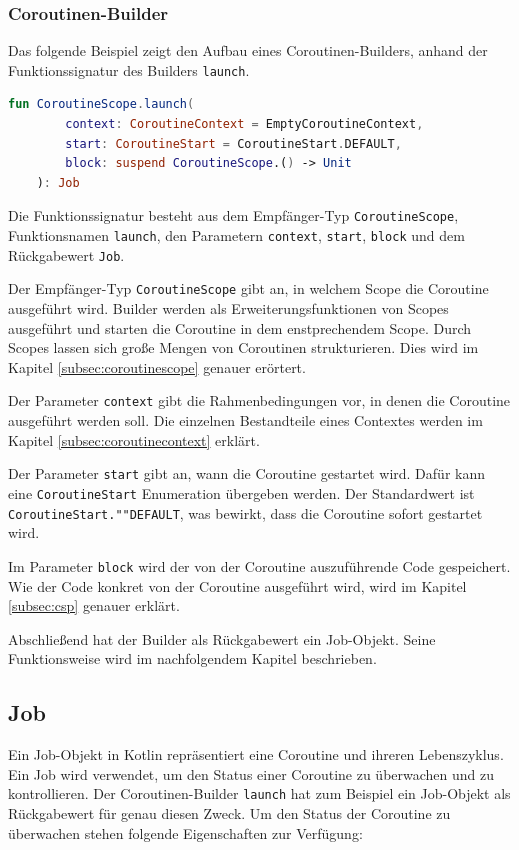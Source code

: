 \documentclass[fontsize=12pt,paper=a4,twoside=semi,parskip=half-,headsepline,headinclude]{scrreprt}
\begin{document}
\subsubsection{Coroutinen-Builder}

Das folgende Beispiel zeigt den Aufbau eines Coroutinen-Builders, anhand der Funktionssignatur des Builders \texttt{launch}.

\begin{lstlisting}[language=Kotlin]
	fun CoroutineScope.launch(
		context: CoroutineContext = EmptyCoroutineContext,
		start: CoroutineStart = CoroutineStart.DEFAULT,
		block: suspend CoroutineScope.() -> Unit
	): Job
\end{lstlisting}

Die Funktionssignatur besteht aus dem Empfänger-Typ \texttt{CoroutineScope}, Funktionsnamen \texttt{launch}, den Parametern \texttt{context}, \texttt{start}, \texttt{block} und dem Rückgabewert \texttt{Job}.

Der Empfänger-Typ \texttt{CoroutineScope} gibt an, in welchem Scope die Coroutine ausgeführt wird. Builder werden als Erweiterungsfunktionen von Scopes ausgeführt und starten die Coroutine in dem enstprechendem Scope. Durch Scopes lassen sich große Mengen von Coroutinen strukturieren. Dies wird im Kapitel \ref{subsec:coroutinescope} genauer erörtert.

Der Parameter \texttt{context} gibt die Rahmenbedingungen vor, in denen die Coroutine ausgeführt werden soll. Die einzelnen Bestandteile eines Contextes werden im Kapitel \ref{subsec:coroutinecontext} erklärt.

Der Parameter \texttt{start} gibt an, wann die Coroutine gestartet wird. Dafür kann eine \texttt{CoroutineStart} Enumeration übergeben werden. Der Standardwert ist \texttt{CoroutineStart.""DEFAULT}, was bewirkt, dass die Coroutine sofort gestartet wird.

Im Parameter \texttt{block} wird der von der Coroutine auszuführende Code gespeichert. Wie der Code konkret von der Coroutine ausgeführt wird, wird im Kapitel \ref{subsec:csp} genauer erklärt.

Abschließend hat der Builder als Rückgabewert ein Job-Objekt. Seine Funktionsweise wird im nachfolgendem Kapitel beschrieben.


\subsection{Job}

Ein Job-Objekt in Kotlin repräsentiert eine Coroutine und ihreren Lebenszyklus. Ein Job wird verwendet, um den Status einer Coroutine zu überwachen und zu kontrollieren. Der Coroutinen-Builder \texttt{launch} hat zum Beispiel ein Job-Objekt als Rückgabewert für genau diesen Zweck. Um den Status der Coroutine zu überwachen stehen folgende Eigenschaften zur Verfügung:
\end{document}
